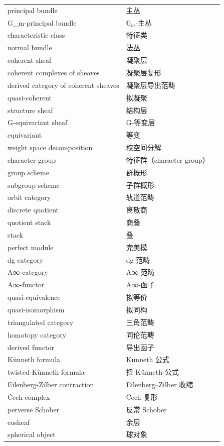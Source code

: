 \documentclass[11pt,a4paper]{article}
\theoremstyle{cnth}
\begin{document}
{\begin{longtable}{p{5.0cm}p{5.6cm}p{3.6cm}}
principal bundle & 主丛 &  \\
G\_m-principal bundle & $\mathbb{G}_m$-主丛 &  \\
characteristic class & 特征类 &  \\
normal bundle & 法丛 &  \\
coherent sheaf & 凝聚层 &  \\
coherent complexes of sheaves & 凝聚层复形 &  \\
derived category of coherent sheaves & 凝聚层导出范畴 &  \\
quasi-coherent & 拟凝聚 &  \\
structure sheaf & 结构层 &  \\
G-equivariant sheaf & G-等变层 &  \\
equivariant & 等变 &  \\
weight space decomposition & 权空间分解 &  \\
character group & 特征群（character group） &  \\
group scheme & 群概形 &  \\
subgroup scheme & 子群概形 &  \\
orbit category & 轨道范畴 &  \\
discrete quotient & 离散商 &  \\
quotient stack & 商叠 &  \\
stack & 叠 &  \\
perfect module & 完美模 &  \\
dg category & dg 范畴 &  \\
A∞-category & A∞-范畴 &  \\
A∞-functor & A∞-函子 &  \\
quasi-equivalence & 拟等价 &  \\
quasi-isomorphism & 拟同构 &  \\
triangulated category & 三角范畴 &  \\
homotopy category & 同伦范畴 &  \\
derived functor & 导出函子 &  \\
Künneth formula & Künneth 公式 &  \\
twisted Künneth formula & 扭 Künneth 公式 &  \\
Eilenberg-Zilber contraction & Eilenberg–Zilber 收缩 &  \\
Čech complex & Čech 复形 &  \\
perverse Schober & 反常 Schober &  \\
cosheaf & 余层 &  \\
spherical object & 球对象 &  \\

\end{longtable}}
\end{document}
